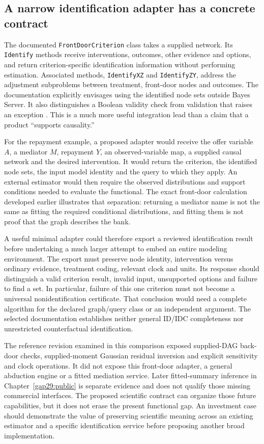 \subsection{A narrow identification adapter has a concrete contract}

The documented \texttt{FrontDoorCriterion} class takes a supplied network. Its
\texttt{Identify} methods receive interventions, outcomes, other evidence
and options, and return criterion-specific identification information without
performing estimation. Associated methods, \texttt{IdentifyXZ} and
\texttt{IdentifyZY}, address the adjustment subproblems between treatment,
front-door nodes and outcomes. The documentation explicitly envisages using
the identified node sets outside Bayes Server. It also distinguishes a Boolean
validity check from validation that raises an exception
\citep{exec14_ci_api_frontdoor}. This is a much more useful integration lead
than a claim that a product ``supports causality.''

For the repayment example, a proposed adapter would receive the offer variable
$A$, a mediator $M$, repayment $Y$, an observed-variable map, a supplied causal
network and the desired intervention. It would return the criterion, the
identified node sets, the input model identity and the query to which they
apply. An external estimator would then require the observed distributions
and support conditions needed to evaluate the functional. The exact
front-door calculation developed earlier illustrates that separation:
returning a mediator name is not the same as fitting the required conditional
distributions, and fitting them is not proof that the graph describes the bank.

A useful minimal adapter could therefore export a reviewed identification
result before undertaking a much larger attempt to embed an entire modeling
environment. The export must preserve node identity, intervention versus
ordinary evidence, treatment coding, relevant clock and units. Its response
should distinguish a valid criterion result, invalid input, unsupported
options and failure to find a set. In particular, failure of this one
criterion must not become a universal nonidentification certificate. That
conclusion would need a complete algorithm for the declared graph/query class
or an independent argument. The selected documentation establishes neither
general ID/IDC completeness nor unrestricted counterfactual identification.

The reference revision examined in this comparison exposed supplied-DAG
back-door checks, supplied-moment Gaussian residual inversion and explicit
sensitivity and clock operations. It did not expose this front-door adapter,
a general abduction engine or a fitted mediation service. Later fitted-summary
inference in Chapter~\ref{gap29:public} is separate evidence and does not
qualify those missing commercial interfaces. The proposed
scientific contract can organize those future capabilities, but it does not
erase the present functional gap. An investment case should demonstrate the
value of preserving scientific meaning across an existing estimator and a
specific identification service before proposing another broad implementation. \citep{exec14_ci_comparison}

